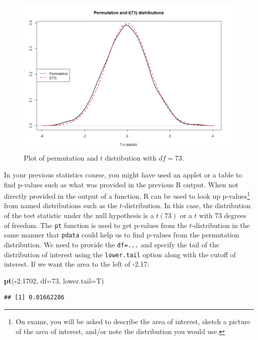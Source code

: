 \documentclass[]{book}
\newenvironment{Shaded}{\begin{snugshade}}{\end{snugshade}}
\newcommand{\KeywordTok}[1]{\textcolor[rgb]{0.13,0.29,0.53}{\textbf{#1}}}
\newcommand{\DataTypeTok}[1]{\textcolor[rgb]{0.13,0.29,0.53}{#1}}
\newcommand{\DecValTok}[1]{\textcolor[rgb]{0.00,0.00,0.81}{#1}}
\newcommand{\FloatTok}[1]{\textcolor[rgb]{0.00,0.00,0.81}{#1}}
\newcommand{\OperatorTok}[1]{\textcolor[rgb]{0.81,0.36,0.00}{\textbf{#1}}}
\newcommand{\NormalTok}[1]{#1}
\let\rmarkdownfootnote\footnote%
\def\footnote{\protect\rmarkdownfootnote}
\theoremstyle{definition}
\theoremstyle{definition}
\theoremstyle{remark}
\begin{document}
\begin{figure}
\centering
\includegraphics{chapter1_files/image047small.png}
\caption{\label{fig:Figure2-14}Plot of permutation and \(t\) distribution with \(df=73\).}
\end{figure}

In your previous statistics course, you might have used an applet or a
table to find p-values such as what was provided in the previous R
output. When not directly provided in the output of a function, R can be
used to look up p-values\footnote{On exams, you will be asked to
  describe the area of interest, sketch a picture of the area of
  interest, and/or note the distribution you would use.} from named
distributions such as the \(t\)-distribution. In this case, the
distribution of the test statistic under the null hypothesis is a
\(t(73)\) or a \(t\) with 73 degrees of freedom. The \texttt{pt}
function is used to get p-values from the \(t\)-distribution in the same
manner that \texttt{pdata} could help us to find p-values from the
permutation distribution. We need to provide the \texttt{df=...} and
specify the tail of the distribution of interest using the
\texttt{lower.tail} option along with the cutoff of interest. If we want
the area to the left of -2.17:

\begin{Shaded}
\begin{Highlighting}[]
\KeywordTok{pt}\NormalTok{(}\OperatorTok{-}\FloatTok{2.1702}\NormalTok{, }\DataTypeTok{df=}\DecValTok{73}\NormalTok{, }\DataTypeTok{lower.tail=}\NormalTok{T)}
\end{Highlighting}
\end{Shaded}

\begin{verbatim}
## [1] 0.01662286
\end{verbatim}
\end{document}
